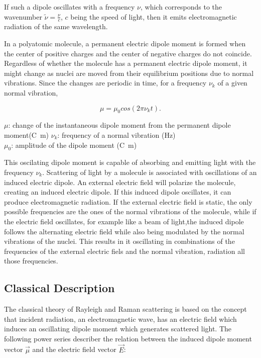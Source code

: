 \bigskip

If such a dipole oscillates with a frequency \(\nu\), which corresponds to the wavenumber \(\widetilde{\nu}=\frac{\nu}{c}\), \(c\) being the speed of light, then it emits electromagnetic radiation of the same wavelength.

\bigskip

In a polyatomic molecule, a permanent electric dipole moment is formed when the center of positive charges and the center of negative charges do not coincide. Regardless of whether the molecule has a permanent electric dipole moment, it might change as nuclei are moved from their equilibrium positions due to normal vibrations. Since the changes are periodic in time, for a frequency \(\nu_k\) of a given normal vibration, 

\begin{equation}
    \mu=\mu_0cos(2\pi\nu_kt).
\end{equation}

\(\mu\): change of the instantaneous dipole moment from the permanent dipole moment(\unit{\coulomb\meter})
\(\nu_k\): frequency of a normal vibration (\unit{\hertz})\\
\(\mu_0\): amplitude of the dipole moment (\unit{\coulomb\meter})

\bigskip

This oscilating dipole moment is capable of absorbing and emitting light with the frequency \(\nu_k\).
Scattering of light by a molecule is associated with oscillations of an induced electric dipole. An external electric field will polarize the molecule, creating an induced electric dipole. If this induced dipole oscillates, it can produce electromagnetic radiation. If the external electric field is static, the only possible frequencies are the ones of the normal vibrations of the molecule, while if the electric field oscillates, for example like a beam of light,the induced dipole follows the alternating electric field while also being modulated by the normal vibrations of the nuclei. This results in it oscillating in combinations of the frequencies of the external electric fiels and the normal vibration, radiation all those frequencies. \cite{theory1}

\subsection{Classical Description}


The classical theory of Rayleigh and Raman scattering is based on the concept that incident radiation, an electromagnetic wave, has an electric field which induces an oscillating dipole moment which generates scattered light. The following power series describer the relation between the induced dipole moment vector \(\overrightarrow{\mu} \) and the electric field vector \(\overrightarrow{E} \): 

